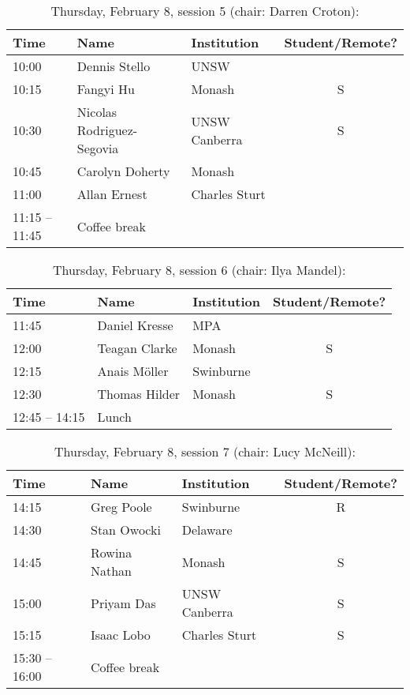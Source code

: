 \documentclass[amsmath,onecolumn]{revtex4-1}
\begin{document}
\begin{table}[!htbp]
	\centering
	\caption{Thursday, February 8, session 5 (chair: Darren Croton):}
\begin{tabular}{| l | l | l | c |}
	\hline
	Time & Name  & Institution & Student/Remote?\\ 		
	\hline
	10:00 & Dennis	Stello & UNSW & \\
	10:15 & Fangyi	Hu & Monash & S \\
	10:30 & Nicolas 	Rodriguez-Segovia  & UNSW Canberra & S\\
	10:45 & Carolyn	Doherty & Monash & \\
	11:00 & 	Allan	Ernest  & Charles Sturt &  \\
	\hline
	11:15 -- 11:45 & Coffee break & & \\
	\hline
\end{tabular}
\end{table}

\begin{table}[!htbp]
	\centering
	\caption{Thursday, February 8, session 6 (chair: Ilya Mandel):}
\begin{tabular}{| l | l | l | c |}
	\hline
	Time & Name  & Institution & Student/Remote? \\ 		
	\hline
	11:45 & Daniel	Kresse & MPA & \\
	12:00 & Teagan	 Clarke & Monash & S\\
	12:15 & Anais	Möller & Swinburne & \\
	12:30 & Thomas	Hilder & Monash & S\\
	\hline
	12:45 -- 14:15 & Lunch & & \\
	\hline
\end{tabular}
\end{table}

\begin{table}[!htbp]
	\centering
	\caption{Thursday, February 8, session 7 (chair: Lucy	McNeill):}
\begin{tabular}{| l | l | l | c |}
	\hline
	Time & Name  & Institution & Student/Remote? \\ 		
	\hline
	14:15& Greg Poole & Swinburne & R \\
	14:30 & Stan	Owocki & Delaware & \\
	14:45 & Rowina	Nathan & Monash & S\\
	15:00 & Priyam	Das  & UNSW Canberra & S \\	
	15:15 &  Isaac	Lobo&  Charles Sturt & S \\
	\hline
	15:30 -- 16:00 & Coffee break & & \\
	\hline
\end{tabular}
\end{table}
	
\end{document}
